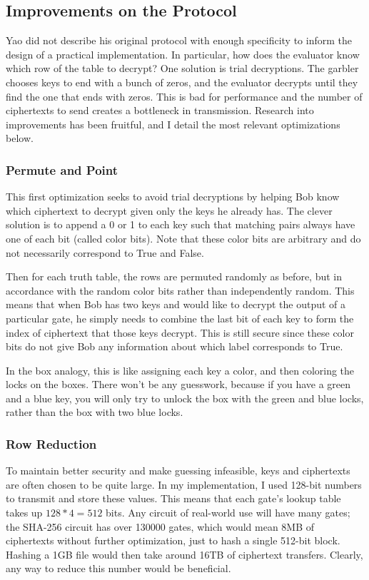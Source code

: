 \subsection{Improvements on the Protocol}
Yao did not describe his original protocol with enough specificity to inform the design of a practical implementation. In particular, how does the evaluator know which row of the table to decrypt? One solution is trial decryptions. The garbler chooses keys to end with a bunch of zeros, and the evaluator decrypts until they find the one that ends with zeros. This is bad for performance and the number of ciphertexts to send creates a bottleneck in transmission. Research into improvements has been fruitful, and I detail the most relevant optimizations below.

\subsubsection{Permute and Point}
This first optimization seeks to avoid trial decryptions by helping Bob know which ciphertext to decrypt given only the keys he already has. The clever solution is to append a 0 or 1 to each key such that matching pairs always have one of each bit (called color bits)\cite{Fairplay}. Note that these color bits are arbitrary and do not necessarily correspond to True and False.

Then for each truth table, the rows are permuted randomly as before, but in accordance with the random color bits rather than independently random. This means that when Bob has two keys and would like to decrypt the output of a particular gate, he simply needs to combine the last bit of each key to form the index of ciphertext that those keys decrypt. This is still secure since these color bits do not give Bob any information about which label corresponds to True\cite{Fairplay}.

In the box analogy, this is like assigning each key a color, and then coloring the locks on the boxes. There won't be any guesswork, because if you have a green and a blue key, you will only try to unlock the box with the green and blue locks, rather than the box with two blue locks.

\subsubsection{Row Reduction}
To maintain better security and make guessing infeasible, keys and ciphertexts are often chosen to be quite large. In my implementation, I used 128-bit numbers to transmit and store these values. This means that each gate's lookup table takes up $128*4=512$ bits. Any circuit of real-world use will have many gates; the SHA-256 circuit has over 130000 gates\cite{bristol}, which would mean 8MB of ciphertexts without further optimization, just to hash a single 512-bit block. Hashing a 1GB file would then take around 16TB of ciphertext transfers. Clearly, any way to reduce this number would be beneficial.

